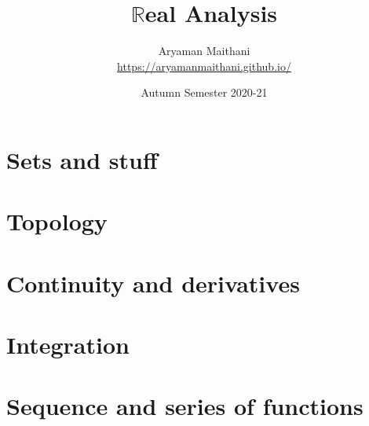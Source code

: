 \documentclass[12pt]{article}
\title{$\mathbb{R}$eal Analysis}
\author{Aryaman Maithani\\\url{https://aryamanmaithani.github.io/}}
\date{Autumn Semester 2020-21}
\theoremstyle{definition}
\numberwithin{thm}{section}
\begin{document}
\maketitle
\tableofcontents
\section{Sets and stuff}
\section{Topology}
\section{Continuity and derivatives}
\section{Integration}
\section{Sequence and series of functions}
\end{document}
